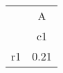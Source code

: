\begin{tabular}{l*{1}{c}}
\hline\hline
            &           A\\
            &          c1\\
\hline
r1          &        0.21\\
\hline\hline
\end{tabular}
